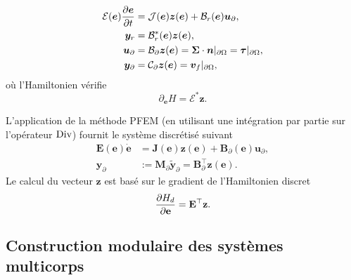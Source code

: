 \begin{equation*}
\begin{aligned}
\mathcal{E}(\bm{e}) \diffp{\bm{e}}{t} &= \mathcal{J}(\bm{e}) \bm{z}(\bm{e}) + \mathcal{B}_r(\bm{e}) \bm{u}_\partial, \\
\bm{y}_r &= \mathcal{B}_r^*(\bm{e}) \bm{z}(\bm{e}), \\
\bm{u}_\partial &= \mathcal{B}_{\partial} \bm{z}(\bm{e}) =  \bm\Sigma \cdot \bm{n}|_{\partial \Omega} = \bm\tau|_{\partial \Omega}, \\
\bm{y}_\partial &= \mathcal{C}_{\partial} \bm{z}(\bm{e}) = \bm{v}_f|_{\partial \Omega},
\end{aligned}
\end{equation*}
où l'Hamiltonien vérifie
\begin{equation*}
\partial_{\bm{e}} H = \bm{\mathcal{E}}^* \bm{z}.
\end{equation*}

L'application de la méthode PFEM (en utilisant une intégration par partie sur l'opérateur $\operatorname*{Div}$) fournit le système discrétisé suivant
\begin{equation*}
\begin{aligned}
\mathbf{E}(\mathbf{e}) \dot{\mathbf{e}} &= \mathbf{J}(\mathbf{e}) \mathbf{z}(\mathbf{e}) + \mathbf{B}_\partial(\mathbf{e}) \mathbf{u}_\partial, \\
\mathbf{y}_\partial &:= \mathbf{M}_\partial \widetilde{\mathbf{y}}_\partial = \mathbf{B}_\partial^\top \mathbf{z}(\mathbf{e}).
\end{aligned}
\end{equation*}
Le calcul du vecteur $\mathbf{z}$ est basé sur le gradient de l'Hamiltonien discret
\[
\diffp{H_d}{\mathbf{e}} = \mathbf{E}^\top \mathbf{z}.
\]
\subsection*{Construction modulaire des systèmes multicorps}

